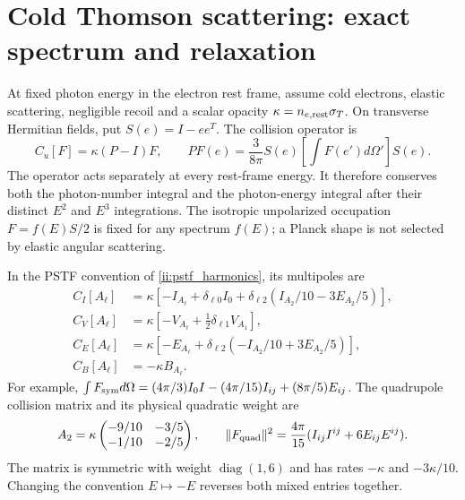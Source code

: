 \section{Cold Thomson scattering: exact spectrum and relaxation}
\label{ii:cold_spectrum_section}
At fixed photon energy in the electron rest frame, assume cold electrons, elastic scattering, negligible recoil and a scalar opacity $\kappa=n_{e,\rm rest}\sigma_T$. On transverse Hermitian fields, put $S(e)=I-ee^T$. The collision operator is
\begin{equation}
 C_u[F]=\kappa(P-I)F,\qquad
 PF(e)=\frac3{8\pi}S(e)\left[\int F(e')d\Omega'\right]S(e).
 \label{ii:rest_thomson}
\end{equation}
The operator acts separately at every rest-frame energy. It therefore conserves both the photon-number integral and the photon-energy integral after their distinct $E^2$ and $E^3$ integrations. The isotropic unpolarized occupation $F=f(E)S/2$ is fixed for any spectrum $f(E)$; a Planck shape is not selected by elastic angular scattering.

In the PSTF convention of \eqref{ii:pstf_harmonics}, its multipoles are
\begin{align}
 C_I[A_\ell]&=\kappa[-I_{A_\ell}+\delta_{\ell0}I_0
                +\delta_{\ell2}(I_{A_2}/10-3E_{A_2}/5)],\nonumber\\
 C_V[A_\ell]&=\kappa[-V_{A_\ell}+\tfrac12\delta_{\ell1}V_{A_1}],\nonumber\\
 C_E[A_\ell]&=\kappa[-E_{A_\ell}+\delta_{\ell2}(-I_{A_2}/10+3E_{A_2}/5)],\nonumber\\
 C_B[A_\ell]&=-\kappa B_{A_\ell}.
 \label{ii:thomson_pstf}
\end{align}
For example,
$\int F_{\rm sym}d\Omega=(4\pi/3)I_0I-(4\pi/15)I_{ij}+(8\pi/5)E_{ij}$.
The quadrupole collision matrix and its physical quadratic weight are
\begin{equation}
 A_2=\kappa\begin{pmatrix}-9/10&-3/5\\-1/10&-2/5\end{pmatrix},
 \qquad
 \|F_{\rm quad}\|^2=\frac{4\pi}{15}(I_{ij}I^{ij}+6E_{ij}E^{ij}).
 \label{ii:thomson_quadrupole_matrix}
\end{equation}
The matrix is symmetric with weight $\operatorname{diag}(1,6)$ and has rates $-\kappa$ and $-3\kappa/10$. Changing the convention $E\mapsto-E$ reverses both mixed entries together.

